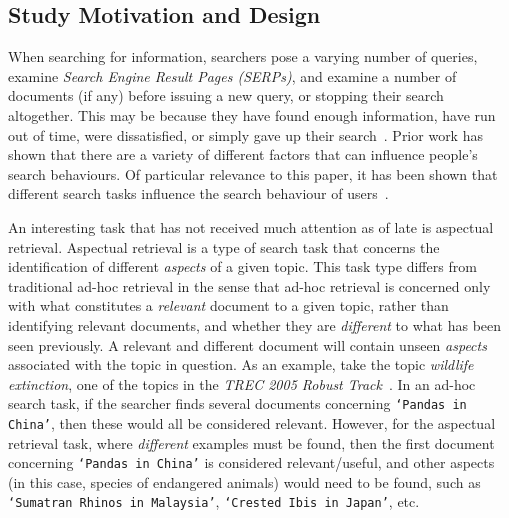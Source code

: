 \subsection{Study Motivation and Design}
When searching for information, searchers pose a varying number of queries, examine \emph{Search Engine Result Pages (SERPs)}, and examine a number of documents (if any) before issuing a new query, or stopping their search altogether. This may be because they have found enough information, have run out of time, were dissatisfied, or simply gave up their search~\cite{diriye2012abandonment, hassan2013beyond_clicks, kiseleva2015serp_fails, dostert2009stopping_behaviours, prabha2007enough, zach2005stopping_behaviours}. Prior work has shown that there are a variety of different factors that can influence people's search behaviours. Of particular relevance to this paper, it has been shown that different search tasks influence the search behaviour of users~\cite{kelly2015search_tasks}.

An interesting task that has not received much attention as of late is aspectual retrieval. Aspectual retrieval is a type of search task that concerns the identification of different \emph{aspects} of a given topic. This task type differs from traditional ad-hoc retrieval in the sense that ad-hoc retrieval is concerned only with what constitutes a \emph{relevant} document to a given topic, rather than identifying relevant documents, and whether they are \emph{different} to what has been seen previously. A relevant and different document will contain unseen \emph{aspects} associated with the topic in question. As an example, take the topic \emph{wildlife extinction}, one of the topics in the \emph{TREC 2005 Robust Track}~\cite{voorhees2006trec_robust}. In an ad-hoc search task, if the searcher finds several documents concerning \texttt{`Pandas in China'}, then these would all be considered relevant. However, for the aspectual retrieval task, where \emph{different} examples must be found, then the first document concerning \texttt{`Pandas in China'} is considered relevant/useful, and other aspects (in this case, species of endangered animals) would need to be found, such as \texttt{`Sumatran Rhinos in Malaysia'}, \texttt{`Crested Ibis in Japan'}, etc.

